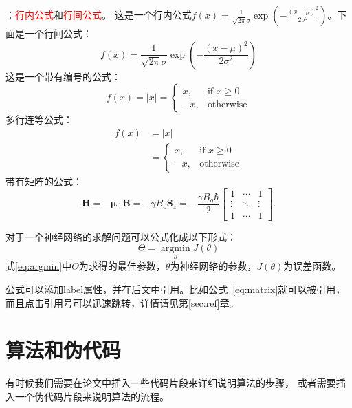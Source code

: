 \documentclass[UTF8]{ctexart}
\numberwithin{equation}{section} %
\numberwithin{table}{section} %
\newcommand{\argmin}{\mathop{\mathrm{argmin}}\limits}
\newcommand{\red}[1]{{\textcolor{red}{#1}}}%
\begin{document}
：\red{行内公式}和\red{行间公式}。
这是一个行内公式$f(x) = \frac{1}{\sqrt{2\pi}\sigma}\exp{(-\frac{(x-\mu)^2}{2\sigma^2})}$。下面是一个行间公式：
$$
f(x) = \frac{1}{\sqrt{2\pi}\sigma}\exp{(-\frac{(x-\mu)^2}{2\sigma^2})}
$$
这是一个带有编号的公式：
\begin{equation}
f(x)= |x| = 
\begin{cases}
x,& \text{if } x\geq 0\\
-x,              & \text{otherwise}
\end{cases}
\label{eq:cases}
\end{equation}
多行连等公式：
\begin{equation}
\begin{split}
f(x) &= |x| \\
&= \begin{cases}
x,& \text{if } x\geq 0\\
-x,              & \text{otherwise}
\end{cases}
\end{split}
\end{equation}
带有矩阵的公式：
\begin{equation}
\mathbf{H} = -\mathbf\mu \cdot \mathbf{B} = -\gamma B_o \mathbf{S}_z = -\frac{\gamma B_o\hbar}{2} 
\begin{bmatrix}
1& \cdots &1\\ 
\vdots & \ddots & \vdots \\
1 & \cdots & 1 
\end{bmatrix}.
\label{eq:matrix}
\end{equation}

对于一个神经网络的求解问题可以公式化成以下形式：
\begin{equation}
\Theta = \argmin_{\theta} J(\theta)
\label{eq:argmin}
\end{equation}
式\ref{eq:argmin}中$\Theta$为求得的最佳参数，$\theta$为神经网络的参数，$J(\theta)$为误差函数。

公式可以添加label属性，并在后文中引用。比如公式~\ref{eq:matrix}就可以被引用，
而且点击引用号可以迅速跳转，详情请见第\ref{sec:ref}章。

\section{算法和伪代码}
有时候我们需要在论文中插入一些代码片段来详细说明算法的步骤，
或者需要插入一个伪代码片段来说明算法的流程。
\end{document}
